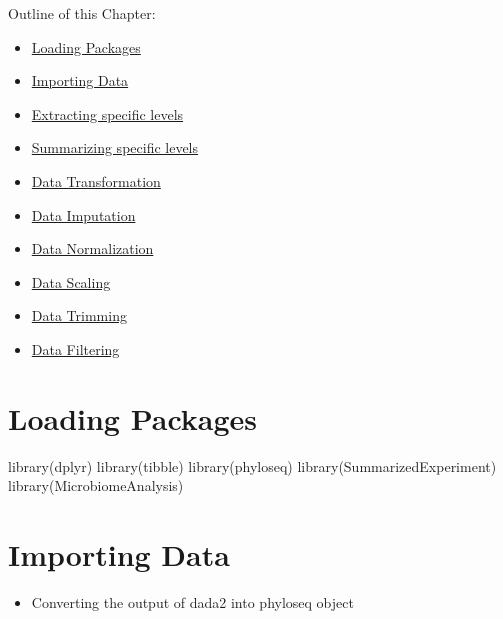 \documentclass[
]{book}
\newenvironment{Shaded}{\begin{snugshade}}{\end{snugshade}}
\newcommand{\FunctionTok}[1]{\textcolor[rgb]{0.00,0.00,0.00}{#1}}
\newcommand{\NormalTok}[1]{#1}
\providecommand{\tightlist}{%
  \setlength{\itemsep}{0pt}\setlength{\parskip}{0pt}}
\begin{document}
Outline of this Chapter:

\begin{itemize}
\item
  \protect\hyperlink{loading-packages}{Loading Packages}
\item
  \protect\hyperlink{importing-data}{Importing Data}
\item
  \protect\hyperlink{extracting-specific-levels}{Extracting specific levels}
\item
  \protect\hyperlink{summarizing-specific-levels}{Summarizing specific levels}
\item
  \protect\hyperlink{data-transformation}{Data Transformation}
\item
  \protect\hyperlink{data-imputation}{Data Imputation}
\item
  \protect\hyperlink{data-normalization}{Data Normalization}
\item
  \protect\hyperlink{data-scaling}{Data Scaling}
\item
  \protect\hyperlink{data-trimming}{Data Trimming}
\item
  \protect\hyperlink{data-filtering}{Data Filtering}
\end{itemize}

\hypertarget{loading-packages}{%
\section{Loading Packages}\label{loading-packages}}

\begin{Shaded}
\begin{Highlighting}[]
\FunctionTok{library}\NormalTok{(dplyr)}
\FunctionTok{library}\NormalTok{(tibble)}
\FunctionTok{library}\NormalTok{(phyloseq)}
\FunctionTok{library}\NormalTok{(SummarizedExperiment)}
\FunctionTok{library}\NormalTok{(MicrobiomeAnalysis)}
\end{Highlighting}
\end{Shaded}

\hypertarget{importing-data}{%
\section{Importing Data}\label{importing-data}}

\begin{itemize}
\tightlist
\item
  Converting the output of dada2 into phyloseq object
\end{itemize}
\end{document}
